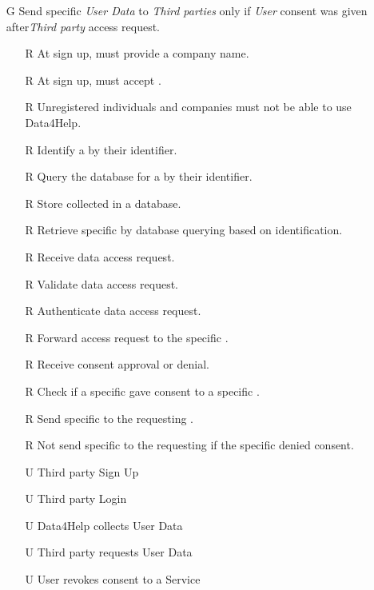 \documentclass[../../../rasd.tex]{subfiles}
\begin{document}
\begin{itemize}
\begin{itemize}
    \end{itemize}

    \item[G\subs{2}]Send specific \textit{User Data} to \textit{Third parties} only if \textit{User} consent was given after\textit{Third party} access request.
    \begin{itemize}
            \item[R\subs{3}]At sign up,  must provide a company name.
            \item[R\subs{5}]At sign up,  must accept .
        \item[R\subs{1}]Unregistered individuals and companies must not be able to use Data4Help.
        \item[R\subs{6}]Identify a  by their identifier.
        \item[R\subs{7}]Query the database for a  by their identifier.
        \item[R\subs{11}]Store collected  in a database.
        \item[R\subs{12}]Retrieve specific  by database querying based on  identification.
        \item[R\subs{13}]Receive  data access request.
        \item[R\subs{14}]Validate  data access request.
        \item[R\subs{15}]Authenticate  data access request.
        \item[R\subs{16}]Forward  access request to the specific .
        \item[R\subs{17}]Receive  consent approval or denial.
        \item[R\subs{18}]Check if a specific  gave consent to a specific .
        \item[R\subs{19}]Send specific to the requesting .
        \item[R\subs{20}]Not send specific to the requesting  if the specific  denied consent.
        \\
        \item[U\subs{2}]Third party Sign Up
        \item[U\subs{4}]Third party Login
        \item[U\subs{5}]Data4Help collects User Data
        \item[U\subs{6}]Third party requests User Data
        \item[U\subs{11}]User revokes consent to a Service
    \end{itemize}


\end{itemize}
\end{document}
